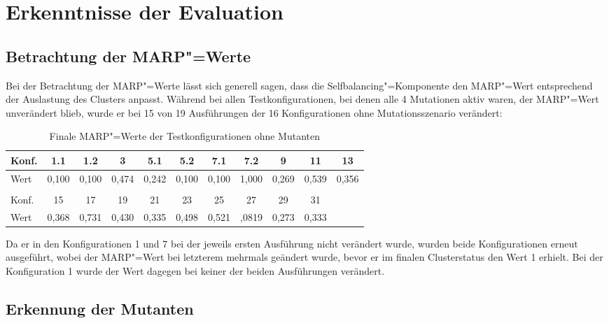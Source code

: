 \section{Erkenntnisse der Evaluation}
\label{sec:evaluationResults}


\subsection{Betrachtung der \ac{MARP}"=Werte}
\label{sec:marpValueResults}

Bei der Betrachtung der \ac{MARP}"=Werte lässt sich generell sagen, dass die Selfbalancing"=Komponente den \ac{MARP}"=Wert entsprechend der Auslastung des Clusters anpasst.
Während bei allen Testkonfigurationen, bei denen alle 4 Mutationen aktiv waren, der \ac{MARP}"=Wert unverändert blieb, wurde er bei 15 von 19 Ausführungen der 16 Konfigurationen ohne Mutationsszenario verändert:

\begin{table}[h]
    \begin{tabular}{l|c|c|c|c|c|c|c|c|c|c}
    	Konf. &  1.1  &  1.2  &   3   &  5.1  &  5.2  &  7.1  &  7.2  &   9   &  11   &  13   \\ \hline
    	Wert     & 0,100 & 0,100 & 0,474 & 0,242 & 0,100 & 0,100 & 1,000 & 0,269 & 0,539 & 0,356 \\
        \multicolumn{11}{c}{} \\
    	Konf. &  15   &  17   &  19   &  21   &  23   &  25   &  27   &  29   &  31   &  \\ \hline
    	Wert     & 0,368 & 0,731 & 0,430 & 0,335 & 0,498 & 0,521 & ,0819 & 0,273 & 0,333 &
    \end{tabular}
    \caption{Finale \ac{MARP}"=Werte der Testkonfigurationen ohne Mutanten}
    \label{tab:finalMarpValues}
\end{table}

Da er in den Konfigurationen 1 und 7 bei der jeweils ersten Ausführung nicht verändert wurde, wurden beide Konfigurationen erneut ausgeführt, wobei der \ac{MARP}"=Wert bei letzterem mehrmals geändert wurde, bevor er im finalen Clusterstatus den Wert 1 erhielt.
Bei der Konfiguration 1 wurde der Wert dagegen bei keiner der beiden Ausführungen verändert.

\subsection{Erkennung der Mutanten}
\label{sec:killingMutants}

